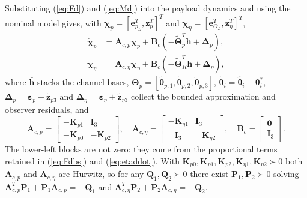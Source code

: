 \documentclass[Review,sageh,times]{sagej}
\begin{document}
Substituting (\ref{eq:Fd}) and (\ref{eq:Md}) into the payload dynamics and using the
nominal model gives, with $\boldsymbol{\chi}_p=[\mathbf{e}_{p_L}^{T},\mathbf{z}_p^{T}]^{T}$ and
$\boldsymbol{\chi}_\eta=[\mathbf{e}_{\Theta_L}^{T},\mathbf{z}_\eta^{T}]^{T}$,
\begin{equation}
\begin{aligned}
\dot{\boldsymbol{\chi}}_p &= \mathbf{A}_{c,p}\boldsymbol{\chi}_p
+ \mathbf{B}_{c}\left(-\tilde{\boldsymbol{\Theta}}_p^{T}\bar{\mathbf{h}} + \boldsymbol{\Delta}_p\right),\\
\dot{\boldsymbol{\chi}}_\eta &= \mathbf{A}_{c,\eta}\boldsymbol{\chi}_\eta
+ \mathbf{B}_{c}\left(-\tilde{\boldsymbol{\Theta}}_R^{T}\bar{\mathbf{h}} + \boldsymbol{\Delta}_\eta\right),
\end{aligned}
\label{eq:closedloop}
\end{equation}
where $\bar{\mathbf{h}}$ stacks the channel bases,
$\tilde{\boldsymbol{\Theta}}_{p}=[\tilde{\boldsymbol{\theta}}_{p,1},\tilde{\boldsymbol{\theta}}_{p,2},\tilde{\boldsymbol{\theta}}_{p,3}]$,
$\tilde{\boldsymbol{\theta}}_i=\hat{\boldsymbol{\theta}}_i-\boldsymbol{\theta}_i^{*}$,
$\boldsymbol{\Delta}_p=\boldsymbol{\varepsilon}_p+\tilde{\mathbf{z}}_{p3}$ and
$\boldsymbol{\Delta}_\eta=\boldsymbol{\varepsilon}_\eta+\tilde{\mathbf{z}}_{\eta3}$ collect the bounded
approximation and observer residuals, and
\begin{equation}
\mathbf{A}_{c,p} =
\begin{bmatrix}
-\mathbf{K}_{p1} & \mathbf{I}_3\\
-\mathbf{K}_{p0} & -\mathbf{K}_{p2}
\end{bmatrix},
\quad
\mathbf{A}_{c,\eta} =
\begin{bmatrix}
-\mathbf{K}_{\eta1} & \mathbf{I}_3\\
-\mathbf{I}_3 & -\mathbf{K}_{\eta2}
\end{bmatrix},
\quad
\mathbf{B}_{c} =
\begin{bmatrix}
\mathbf{0}\\\mathbf{I}_3
\end{bmatrix}.
\label{eq:Ac}
\end{equation}
The lower-left blocks are not zero: they come from the proportional terms
retained in (\ref{eq:Fdbs}) and (\ref{eq:etaddot}). With
$\mathbf{K}_{p0},\mathbf{K}_{p1},\mathbf{K}_{p2},\mathbf{K}_{\eta1},\mathbf{K}_{\eta2}\succ0$ both
$\mathbf{A}_{c,p}$ and $\mathbf{A}_{c,\eta}$ are Hurwitz, so for any $\mathbf{Q}_1,\mathbf{Q}_2\succ0$
there exist $\mathbf{P}_1,\mathbf{P}_2\succ0$ solving
$\mathbf{A}_{c,p}^{T}\mathbf{P}_1+\mathbf{P}_1\mathbf{A}_{c,p}=-\mathbf{Q}_1$ and
$\mathbf{A}_{c,\eta}^{T}\mathbf{P}_2+\mathbf{P}_2\mathbf{A}_{c,\eta}=-\mathbf{Q}_2$.
\end{document}
